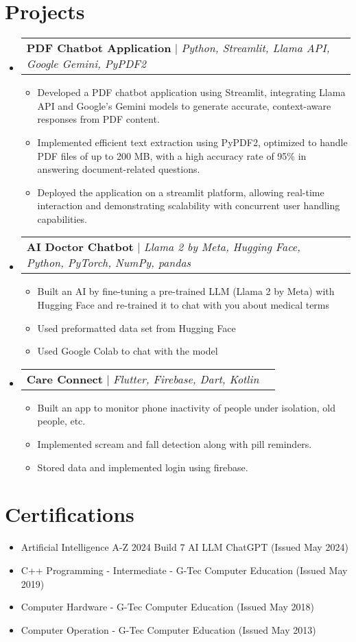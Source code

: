 \documentclass[letterpaper,11pt]{article}
\makeatletter
\newcommand{\resumeItem}[1]{
  \item\small{
    {#1 \vspace{-2pt}}
  }
}
\newcommand{\resumeProjectHeading}[2]{
    \item
    \begin{tabular*}{0.97\textwidth}{l@{\extracolsep{\fill}}r}
      \small#1 & #2 \\
    \end{tabular*}\vspace{-7pt}
}
\newcommand{\resumeSubHeadingListStart}{\begin{itemize}[leftmargin=0.15in, label={}]}
\newcommand{\resumeSubHeadingListEnd}{\end{itemize}}
\newcommand{\resumeItemListStart}{\begin{itemize}}
\newcommand{\resumeItemListEnd}{\end{itemize}\vspace{-5pt}}
\makeatother
\begin{document}
\section{Projects}
    \resumeSubHeadingListStart
      \resumeProjectHeading
          {\textbf{PDF Chatbot Application} $|$ \emph{Python, Streamlit, Llama API, Google Gemini, PyPDF2}}{}
          \resumeItemListStart
            \resumeItem{Developed a PDF chatbot application using Streamlit, integrating Llama API and Google’s Gemini models to generate accurate, context-aware responses from PDF content.}
            \resumeItem{Implemented efficient text extraction using PyPDF2, optimized to handle PDF files of up to 200 MB, with a high accuracy rate of 95\% in answering document-related questions.}
            \resumeItem{Deployed the application on a streamlit platform, allowing real-time interaction and demonstrating scalability with concurrent user handling capabilities.}
          \resumeItemListEnd
      \resumeProjectHeading
          {\textbf{AI Doctor Chatbot} $|$ \emph{Llama 2 by Meta, Hugging Face, Python, PyTorch, NumPy, pandas}}{}
          \resumeItemListStart
            \resumeItem{Built an AI by fine-tuning a pre-trained LLM (Llama 2 by Meta) with Hugging Face and re-trained it to chat with you about medical terms}
            \resumeItem{Used preformatted data set from Hugging Face}
            \resumeItem{Used Google Colab to chat with the model}
          \resumeItemListEnd
      \resumeProjectHeading
          {\textbf{Care Connect} $|$ \emph{Flutter, Firebase, Dart, Kotlin}}{}
          \resumeItemListStart
            \resumeItem{Built an app to monitor phone inactivity of people under isolation, old people, etc.}
            \resumeItem{Implemented scream and fall detection along with pill reminders.}
            \resumeItem{Stored data and implemented login using firebase.}
          \resumeItemListEnd
    \resumeSubHeadingListEnd

\section{Certifications}
  \resumeSubHeadingListStart
    \resumeItemListStart
      \resumeItem{Artificial Intelligence A-Z 2024 Build 7 AI LLM ChatGPT (Issued May 2024)}
      \resumeItem{C++ Programming - Intermediate - G-Tec Computer Education (Issued May 2019)}
      \resumeItem{Computer Hardware - G-Tec Computer Education (Issued May 2018)}
      \resumeItem{Computer Operation - G-Tec Computer Education (Issued May 2013)}
    \resumeItemListEnd
  \resumeSubHeadingListEnd
\end{document}
